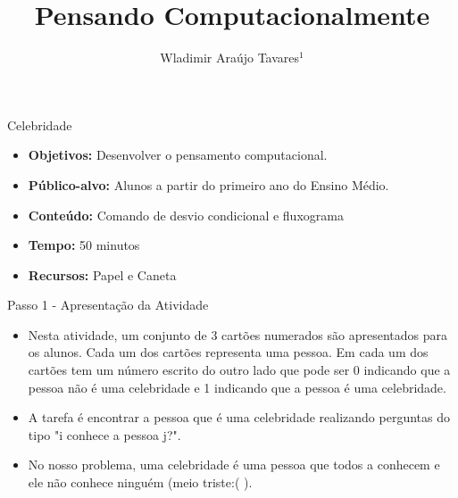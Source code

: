 \documentclass{beamer}
\title {Pensando Computacionalmente}
\author[Wladimir Araújo Tavares]{ Wladimir Araújo Tavares$^{1}$  }
\institute[UFC]{$^{1}$Universidade Federal do Ceará - Campus de Quixadá\\}
\date{}
\begin{document}
\begin{frame}
	\titlepage
\end{frame}




\begin{frame}{Celebridade}

\begin{itemize}
\item \textbf{Objetivos:} Desenvolver o pensamento computacional.

\item \textbf{Público-alvo:}  Alunos a partir do primeiro ano do Ensino Médio.

\item \textbf{Conteúdo:} Comando de desvio condicional e fluxograma

\item \textbf{Tempo:} 50 minutos

\item \textbf{Recursos:} Papel e Caneta

\end{itemize}
    
\end{frame}




\begin{frame}{Passo 1 - Apresentação da Atividade}

\begin{itemize}
   
\item <1->Nesta atividade, um conjunto de 3 cartões numerados são apresentados para os alunos. Cada um dos cartões representa uma pessoa. Em cada um dos cartões tem um número escrito do outro lado que pode ser 0 indicando que a pessoa não é uma celebridade e 1 indicando que a pessoa é uma celebridade.

\begin{center}
\end{center}



\item <2->A tarefa é encontrar a pessoa que é uma celebridade realizando perguntas do tipo "i conhece a pessoa j?".

\item <3-> No nosso problema, uma celebridade é uma pessoa que todos a conhecem e ele não conhece ninguém (meio triste:( ). 



\end{itemize}

\end{frame}
\end{document}
